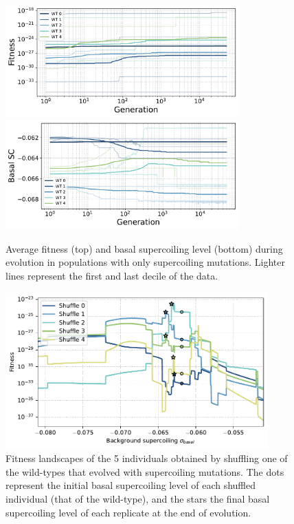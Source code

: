 \begin{figure}
\centering
\includegraphics[width=0.8\textwidth]{epistasis/img/sc-only/fitness_per_wt.pdf}
\includegraphics[width=0.8\textwidth]{epistasis/img/sc-only/sc_per_wt.pdf}
\caption[Average basal supercoiling and fitness during evolution with only basal supercoiling level mutations]{Average fitness (top) and basal supercoiling level (bottom) during evolution in populations with only supercoiling mutations.
Lighter lines represent the first and last decile of the data.}
\label{fig:epistasis:sc-only-evolution}
\end{figure}

\begin{figure}
\centering
\includegraphics[width=0.9\textwidth]{epistasis/img/with-sc/fitness_landscapes_wt_01_with_evolved.pdf}
\caption[Fitness landscapes with only supercoiling mutations]{Fitness landscapes of the 5 individuals obtained by shuffling one of the wild-types that evolved with supercoiling mutations.
The dots represent the initial basal supercoiling level of each shuffled individual (that of the wild-type), and the stars the final basal supercoiling level of each replicate at the end of evolution.}
\label{fig:epistasis:sc-only-fitness-landscape}
\end{figure}


